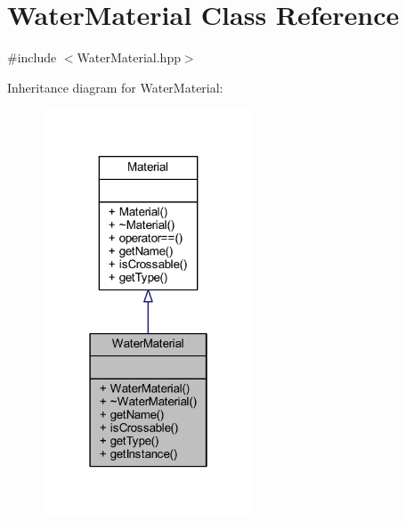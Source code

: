 \hypertarget{class_water_material}{}\section{Water\+Material Class Reference}
\label{class_water_material}


{\ttfamily \#include $<$Water\+Material.\+hpp$>$}



Inheritance diagram for Water\+Material\+:\nopagebreak
\begin{figure}[H]
\begin{center}
\leavevmode
\includegraphics[width=178pt]{class_water_material__inherit__graph}
\end{center}
\end{figure}


